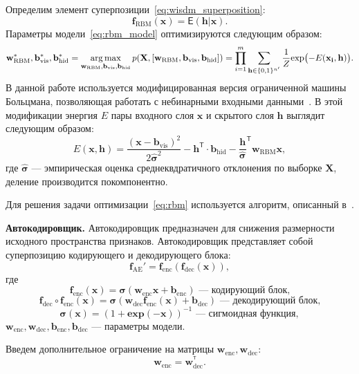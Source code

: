 Определим элемент суперпозиции~\eqref{eq:wisdm_superposition}: 
\begin{equation}
\label{eq:rbm_model}
\mathbf{f}_\text{RBM}(\mathbf{x}) = \mathsf{E}(\mathbf{h}|\mathbf{x}).
\end{equation}
Параметры модели~\eqref{eq:rbm_model} оптимизируются следующим образом:
\begin{equation}
\label{eq:rbm}
{\mathbf{w}}^{*}_\text{RBM},{\mathbf{b}}^{*}_\text{vis}, {\mathbf{b}}^{*}_\text{hid} = \operatorname*{arg\,max}_{{\mathbf{w}_\text{RBM}},{\mathbf{b}}_\text{vis}, {\mathbf{b}}_\text{hid} } p(\mathbf{X}, [{\mathbf{w}_\text{RBM}},{\mathbf{b}}_\text{vis}, {\mathbf{b}}_\text{hid}]) = \prod_{i=1}^m \sum_{\mathbf{h}\in \{0,1\}^{n'}} \frac{1}{Z} \text{exp}\bigl(-E(\mathbf{\mathbf{x}_i},\mathbf{h)}\bigr).
\end{equation}
В данной работе используется модифицированная версия ограниченной машины Больцмана, позволяющая работать с небинарными входными данными~\cite{gbrbm}. В этой модификации энергия $E$ пары входного слоя $\mathbf{x}$ и скрытого слоя $\mathbf{h}$ выглядит следующим образом:
\[
E(\mathbf{x},\mathbf{h}) = \frac{(\mathbf{x} - \mathbf{b}_\text{vis})^2}{2\hat{\boldsymbol{\sigma}}^2} -\mathbf{h}^\mathsf{T} \cdot \mathbf{b}_\text{hid} - \frac{\mathbf{h}}{\hat{\boldsymbol{\sigma}}}^\mathsf{T}\mathbf{w}_\text{RBM}\mathbf{x},
\]
где $\hat{\boldsymbol{\sigma}}$ --- эмпирическая оценка среднеквдратичного отклонения по выборке $\mathbf{X}$, деление производится покомпонентно. 


Для решения задачи оптимизации~\eqref{eq:rbm} используется алгоритм, описанный в~\cite{hinton_rbm}.

\textbf{Автокодировщик.}
Автокодировщик предназначен для снижения размерности исходного пространства признаков.
Автокодировщик представляет собой суперпозицию кодирующего и декодирующего блока:
\[
 \mathbf{f}_\text{AE}' = \mathbf{f}_\text{enc}(\mathbf{f}_\text{dec}(\mathbf{x})),
\]
где $$ \mathbf{f}_\text{enc}(\mathbf{x}) = \boldsymbol{\sigma}(\mathbf{w}_\text{enc}\mathbf{x}+\mathbf{b}_\text{enc}) \text{ --- кодирующий блок,}$$
$$  \mathbf{f}_\text{dec} \circ \mathbf{f}_\text{enc}(\mathbf{x}) = \boldsymbol{\sigma}(\mathbf{w}_\text{dec}\mathbf{f}_\text{enc}(\mathbf{x})+\mathbf{b}_\text{dec})\text{ --- декодирующий блок,}$$ $$\boldsymbol{\sigma}(\mathbf{x}) = (1+\textbf{exp}({-\mathbf{x}}))^{-1} \text{ --- сигмоидная функция},$$ $\mathbf{w}_\text{enc},\mathbf{w}_\text{dec},\mathbf{b}_\text{enc}, \mathbf{b}_\text{dec}$ --- параметры модели.

Введем дополнительное ограничение на матрицы $\mathbf{w}_\text{enc}, \mathbf{w}_\text{dec}$:
\[
 \mathbf{w}_\text{enc} = \mathbf{w}_\text{dec}^{^\mathsf{T}}.
\]

